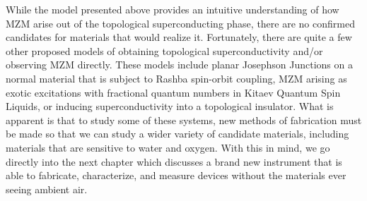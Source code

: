 While the model presented above provides an intuitive understanding of how \ac{MZM} arise out of the topological superconducting phase, there are no confirmed candidates for materials that would realize it. Fortunately, there are quite a few other proposed models of obtaining topological superconductivity and/or observing \ac{MZM} directly. These models include planar Josephson Junctions on a normal material that is subject to Rashba spin-orbit coupling\cite{Hell2017, Pientka2017, Whiticar2020}, \ac{MZM} arising as exotic excitations with fractional quantum numbers in Kitaev Quantum Spin Liquids\cite{KITAEV20062,Wang2020}, or inducing superconductivity into a topological insulator\cite{FuKane2008}. What is apparent is that to study some of these systems, new methods of fabrication must be made so that we can study a wider variety of candidate materials, including materials that are sensitive to water and oxygen. With this in mind, we go directly into the next chapter which discusses a brand new instrument that is able to fabricate, characterize, and measure devices without the materials ever seeing ambient air.